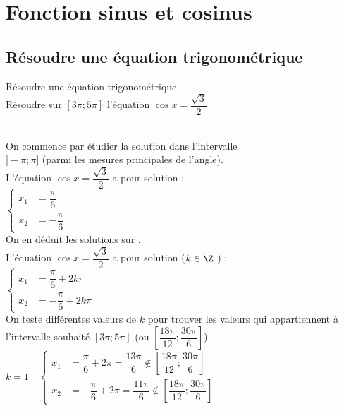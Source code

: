 \chapter{Fonction sinus et cosinus}
\thispagestyle{fancy}

\vspace{-0.5cm}

	\section{Résoudre une équation trigonométrique}
	
		\begin{bmethodet}{Résoudre une équation trigonométrique}
			\\
			Résoudre sur $[3\pi;5\pi]$ l'équation $\cos x=\dfrac{\sqrt{3}}{2}$
			\\
			\ \\
			\begin{minipage}{0.65\linewidth}
				On commence par étudier la solution dans l'intervalle\\ $]-\pi;\pi]$ (parmi les mesures principales de l'angle).\\
				L'équation $\cos x=\dfrac{\sqrt{3}}{2}$ a pour solution :\\
				$\begin{cases}
					x_1 &=\dfrac{\pi}{6}\\
					x_2 &=-\dfrac{\pi}{6}
					\end{cases}$\\
				On en déduit les solutions sur \R.\\
				L'équation $\cos x=\dfrac{\sqrt{3}}{2}$ a pour solution ($k\in \Z$ ) :\\
				$\begin{cases}
						x_1 &=\dfrac{\pi}{6}+2k\pi\\
						x_2 &=-\dfrac{\pi}{6}+2k\pi\
					\end{cases}$\\
				On teste différentes valeurs de $k$ pour trouver les valeurs qui appartiennent à l'intervalle souhaité $[3\pi;5\pi]$ (ou $\left[\dfrac{18\pi}{12};\dfrac{30\pi}{6}\right]$)\\
				$k=1\quad \begin{cases}
						x_1 &=\dfrac{\pi}{6}+2\pi=\dfrac{13\pi}{6}\notin\left[\dfrac{18\pi}{12};\dfrac{30\pi}{6}\right]\\
						x_2 &=-\dfrac{\pi}{6}+2\pi=\dfrac{11\pi}{6}\notin\left[\dfrac{18\pi}{12};\dfrac{30\pi}{6}\right]
					\end{cases}$\\

\end{minipage}
\end{bmethodet}
